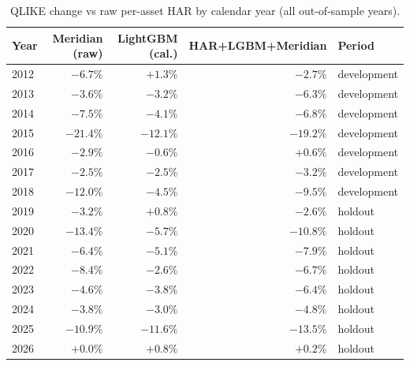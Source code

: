 \begin{table}[!htbp]
\centering
\small
\caption{QLIKE change vs raw per-asset HAR by calendar year (all out-of-sample years).}
\label{tab:volyear}
\begin{tabularx}{\linewidth}{lrrrX}
\toprule
\textbf{Year} & \textbf{Meridian (raw)} & \textbf{LightGBM (cal.)} & \textbf{HAR+LGBM+Meridian} & \textbf{Period} \\
\midrule
2012 & $-6.7\%$ & $+1.3\%$ & $-2.7\%$ & development \\
2013 & $-3.6\%$ & $-3.2\%$ & $-6.3\%$ & development \\
2014 & $-7.5\%$ & $-4.1\%$ & $-6.8\%$ & development \\
2015 & $-21.4\%$ & $-12.1\%$ & $-19.2\%$ & development \\
2016 & $-2.9\%$ & $-0.6\%$ & $+0.6\%$ & development \\
2017 & $-2.5\%$ & $-2.5\%$ & $-3.2\%$ & development \\
2018 & $-12.0\%$ & $-4.5\%$ & $-9.5\%$ & development \\
2019 & $-3.2\%$ & $+0.8\%$ & $-2.6\%$ & holdout \\
2020 & $-13.4\%$ & $-5.7\%$ & $-10.8\%$ & holdout \\
2021 & $-6.4\%$ & $-5.1\%$ & $-7.9\%$ & holdout \\
2022 & $-8.4\%$ & $-2.6\%$ & $-6.7\%$ & holdout \\
2023 & $-4.6\%$ & $-3.8\%$ & $-6.4\%$ & holdout \\
2024 & $-3.8\%$ & $-3.0\%$ & $-4.8\%$ & holdout \\
2025 & $-10.9\%$ & $-11.6\%$ & $-13.5\%$ & holdout \\
2026 & $+0.0\%$ & $+0.8\%$ & $+0.2\%$ & holdout \\
\bottomrule
\end{tabularx}
\end{table}
